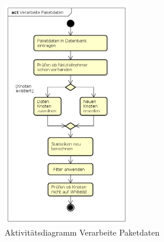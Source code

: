     \begin{figure}[h!]
        \centering
        \includegraphics[width=0.5\textwidth]{../diagrams/AD_Verarbeite_Paketdaten}
        \caption{Aktivitätsdiagramm Verarbeite Paketdaten}
    \end{figure}
